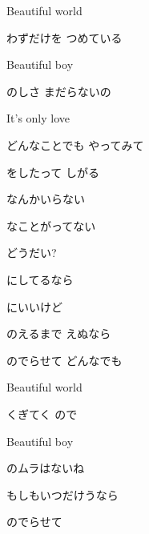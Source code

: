 \documentclass[14pt]{ltjsarticle}
\begin{document}
{  Beautiful world
  \jisho{}

  わずだけを つめている
  \jisho{}

  Beautiful boy
  \jisho{}

  のしさ まだらないの
  \jisho{}

\item
  It's only love
  \jisho{}

\item

  どんなことでも やってみて
  \jisho{}

  をしたって しがる

\item
  なんかいらない
  \jisho{}

  なことがってない

  どうだい?

  にしてるなら
  \jisho{}

  にいいけど
  \jisho{}

\item
  のえるまで えぬなら
  \jisho{}

  のでらせて どんなでも
  \jisho{}

  Beautiful world
  \jisho{}

  くぎてく ので

  Beautiful boy
  \jisho{}

  のムラはないね

\item

  もしもいつだけうなら
  \jisho{}

  のでらせて
  \jisho{}

}
\end{document}
